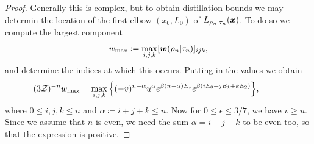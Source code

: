 \documentclass[pra,
aps,
twocolumn,
superscriptaddress,
groupedaddress,
nofootinbib,
reprint
]{revtex4-1}
\begin{document}
\begin{proof}
Generally this is complex, but to obtain distillation bounds we may determin the location of the first elbow $(x_0, L_0)$ of $L_{\rho_n|\tau_n}(\boldsymbol{x})$. To do so we compute the largest component 
\begin{equation}
w_{\rm max} := \max_{i,j,k} [\boldsymbol{w}(\rho_n | \tau_n)]_{ijk},
\end{equation}
and determine the indices at which this occurs.
Putting in the values we obtain
\begin{align}
	\hspace{-1cm}(3\Z)^{-n}w_{\rm max}= \max\limits_{i,j,k}\Big\{ (-v)^{n-\alpha} u^{\alpha} e^{\beta (n-\alpha)E_s} e^{\beta ( i E_0 + j E_1 + k E_2 )} \Big\}, \label{eq:max_slope}
\end{align}
where $0 \leq i,j,k \leq n$ and $\alpha \coloneqq i+j+k \leq n$.
Now for $0 \leq \epsilon \leq 3/7$, we have $v \geq u$. Since we assume that $n$ is even, we need the sum $\alpha = i+j+k$ to be even too, so that the expression is positive. 


\end{proof}
\end{document}
